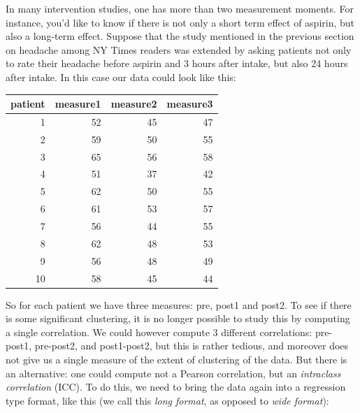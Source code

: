 \documentclass[]{report}\usepackage[]{graphicx}\usepackage[]{color}
\newenvironment{knitrout}{}{} %
\begin{document}
In many intervention studies, one has more than two measurement moments. For instance, you'd like to know if there is not only a short term effect of aspirin, but also a long-term effect. Suppose that the study mentioned in the previous section on headache among NY Times readers was extended by asking patients not only to rate their headache before aspirin and 3 hours after intake, but also 24 hours after intake. In this case our data could look like this:

\begin{knitrout}
\color{fgcolor}
\begin{tabular}{r|r|r|r}
\hline
patient & measure1 & measure2 & measure3\\
\hline
1 & 52 & 45 & 47\\
\hline
2 & 59 & 50 & 55\\
\hline
3 & 65 & 56 & 58\\
\hline
4 & 51 & 37 & 42\\
\hline
5 & 62 & 50 & 55\\
\hline
6 & 61 & 53 & 57\\
\hline
7 & 56 & 44 & 55\\
\hline
8 & 62 & 48 & 53\\
\hline
9 & 56 & 48 & 49\\
\hline
10 & 58 & 45 & 44\\
\hline
\end{tabular}


\end{knitrout}

So for each patient we have three measures: pre, post1 and post2. To see if there is some significant clustering, it is no longer possible to study this by computing a single correlation. We could however compute 3 different correlations: pre-post1, pre-post2, and post1-post2, but this is rather tedious, and moreover does not give us a single measure of the extent of clustering of the data. But there is an alternative: one could compute not a Pearson correlation, but an \textit{intraclass correlation} (ICC). To do this, we need to bring the data again into a regression type format, like this (we call this \textit{long format}, as opposed to \textit{wide format}):
\end{document}
